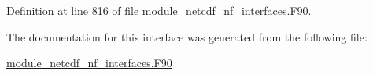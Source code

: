 Definition at line 816 of file module\+\_\+netcdf\+\_\+nf\+\_\+interfaces.\+F90.



The documentation for this interface was generated from the following file\+:\begin{DoxyCompactItemize}
\item 
\hyperlink{module__netcdf__nf__interfaces_8F90}{module\+\_\+netcdf\+\_\+nf\+\_\+interfaces.\+F90}\end{DoxyCompactItemize}

